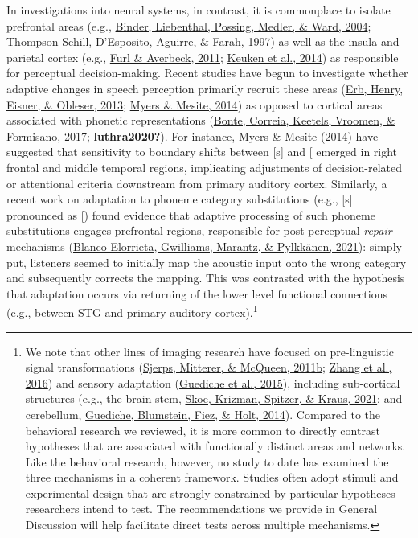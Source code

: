 \documentclass[
  11pt,
  english,
  man,floatsintext]{apa6}
\begin{document}
In investigations into neural systems, in contrast, it is commonplace to isolate prefrontal areas (e.g., \protect\hyperlink{ref-binder2004neural}{Binder, Liebenthal, Possing, Medler, \& Ward, 2004}; \protect\hyperlink{ref-thompson1997role}{Thompson-Schill, D'Esposito, Aguirre, \& Farah, 1997}) as well as the insula and parietal cortex (e.g., \protect\hyperlink{ref-furl2011parietal}{Furl \& Averbeck, 2011}; \protect\hyperlink{ref-keuken2014}{Keuken et al., 2014}) as responsible for perceptual decision-making. Recent studies have begun to investigate whether adaptive changes in speech perception primarily recruit these areas (\protect\hyperlink{ref-erb2013brain}{Erb, Henry, Eisner, \& Obleser, 2013}; \protect\hyperlink{ref-myers-mesite2014}{Myers \& Mesite, 2014}) as opposed to cortical areas associated with phonetic representations (\protect\hyperlink{ref-bonte2017}{Bonte, Correia, Keetels, Vroomen, \& Formisano, 2017}; \protect\hyperlink{ref-luthra2020}{\textbf{luthra2020?}}). For instance, \protect\hyperlink{ref-myers-mesite2014}{Myers \& Mesite} (\protect\hyperlink{ref-myers-mesite2014}{2014}) have suggested that sensitivity to boundary shifts between {[}s{]} and {[}\ipatext{ʃ}{]} emerged in right frontal and middle temporal regions, implicating adjustments of decision-related or attentional criteria downstream from primary auditory cortex. Similarly, a recent work on adaptation to phoneme category substitutions (e.g., {[}s{]} pronounced as {[}\ipatext{ʃ}{]}) found evidence that adaptive processing of such phoneme substitutions engages prefrontal regions, responsible for post-perceptual \emph{repair} mechanisms (\protect\hyperlink{ref-blanco-elorriera2021}{Blanco-Elorrieta, Gwilliams, Marantz, \& Pylkkänen, 2021}): simply put, listeners seemed to initially map the acoustic input onto the wrong category and subsequently corrects the mapping. This was contrasted with the hypothesis that adaptation occurs via returning of the lower level functional connections (e.g., between STG and primary auditory cortex).\footnote{We note that other lines of imaging research have focused on pre-linguistic signal transformations (\protect\hyperlink{ref-sjerps2011listening}{Sjerps, Mitterer, \& McQueen, 2011b}; \protect\hyperlink{ref-zhang2016functionally}{Zhang et al., 2016}) and sensory adaptation (\protect\hyperlink{ref-guediche2015evidence}{Guediche et al., 2015}), including sub-cortical structures (e.g., the brain stem, \protect\hyperlink{ref-skoe2021auditory}{Skoe, Krizman, Spitzer, \& Kraus, 2021}; and cerebellum, \protect\hyperlink{ref-guediche2014}{Guediche, Blumstein, Fiez, \& Holt, 2014}). Compared to the behavioral research we reviewed, it is more common to directly contrast hypotheses that are associated with functionally distinct areas and networks. Like the behavioral research, however, no study to date has examined the three mechanisms in a coherent framework. Studies often adopt stimuli and experimental design that are strongly constrained by particular hypotheses researchers intend to test. The recommendations we provide in General Discussion will help facilitate direct tests across multiple mechanisms.}
\end{document}
